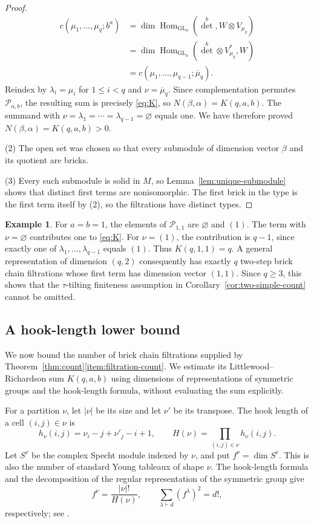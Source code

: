 \documentclass[a4paper,reqno,10pt]{amsart}
\theoremstyle{definition}
\newtheorem{example}[theorem]{Example}
\numberwithin{equation}{section}
\newcommand{\Hom}{\operatorname{Hom}}
\newcommand{\GL}{\operatorname{GL}}
\newcommand{\parts}{\mathcal P}
\begin{document}
\begin{proof}
\begin{align*}
 c(\mu_1,\ldots,\mu_q;b^a)
 &=\dim\Hom_{\GL_a}(\det^b,W\otimes V_{\mu_q})\\
 &=\dim\Hom_{\GL_a}(\det^b\otimes V_{\mu_q}^*,W)\\
 &=c(\mu_1,\ldots,\mu_{q-1};\overline\mu_q).
\end{align*}
Reindex by $\lambda_i=\mu_i$ for $1\leq i<q$ and
$\nu=\overline\mu_q$. Since complementation permutes $\parts_{a,b}$,
the resulting sum is precisely \eqref{eq:K}, so
$N(\beta,\alpha)=K(q,a,b)$. The summand with
$\nu=\lambda_1=\cdots=\lambda_{q-1}=\varnothing$ equals one. We have
therefore proved $N(\beta,\alpha)=K(q,a,b)>0$.

(2) The open set was chosen so that every submodule of dimension
vector $\beta$ and its quotient are bricks.

(3) Every such submodule is solid in $M$, so
Lemma~\ref{lem:unique-submodule} shows that distinct first terms are
nonisomorphic. The first brick in the type is the first term itself
by (2), so the filtrations have distinct types.
\end{proof}

\begin{example}\label{ex:small-count}
For $a=b=1$, the elements of $\parts_{1,1}$ are $\varnothing$ and $(1)$.
The term with $\nu=\varnothing$ contributes one to \eqref{eq:K}. For
$\nu=(1)$, the contribution is $q-1$, since exactly one of
$\lambda_1,\ldots,\lambda_{q-1}$ equals $(1)$. Thus $K(q,1,1)=q$.
A general representation of dimension $(q,2)$ consequently has exactly
$q$ two-step brick chain filtrations whose first term has dimension vector
$(1,1)$. Since $q\geq3$, this shows that the $\tau$-tilting
finiteness assumption in Corollary~\ref{cor:two-simple-count} cannot
be omitted.
\end{example}

\subsection{A hook-length lower bound}

We now bound the number of brick chain filtrations supplied by
Theorem~\ref{thm:count}\ref{item:filtration-count}. We estimate its Littlewood--Richardson sum
$K(q,a,b)$ using dimensions of representations of symmetric groups and
the hook-length formula, without evaluating the sum explicitly.

For a partition $\nu$, let $|\nu|$ be its size and let $\nu'$ be its
transpose. The hook length of a cell $(i,j)\in\nu$ is
\[
 h_\nu(i,j)=\nu_i-j+\nu'_j-i+1,
 \qquad H(\nu)=\prod_{(i,j)\in\nu}h_\nu(i,j).
\]
Let $S^\nu$ be the complex Specht module indexed by $\nu$, and put
$f^\nu=\dim S^\nu$. This is also the number of standard Young tableaux
of shape $\nu$. The hook-length formula and the decomposition of the
regular representation of the symmetric group give
\begin{equation}\label{eq:specht-identities}
 f^\nu=\frac{|\nu|!}{H(\nu)},
 \qquad \sum_{\lambda\vdash d}(f^\lambda)^2=d!,
\end{equation}
respectively; see \cite[Sections~2.2--2.3]{PPY}.
\end{document}
